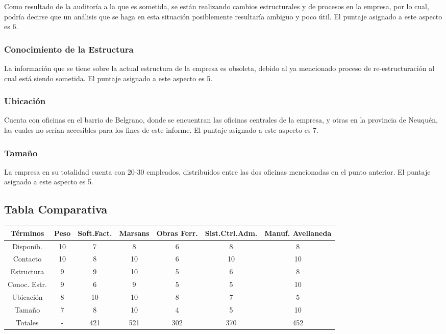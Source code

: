 \documentclass[12pt,a4paper,spanish]{article}
\begin{document}
Como resultado de la auditor\'{i}a a la que es sometida, se est\'{a}n realizando cambios estructurales y de procesos en la empresa, por lo cual, podr\'{i}a decirse que un an\'{a}lisis que se haga en esta situaci\'{o}n posiblemente resultar\'{i}a ambiguo y poco \'{u}til. El puntaje asignado a este aspecto es 6.

\subsubsection{Conocimiento de la Estructura}

La informaci\'{o}n que se tiene sobre la actual estructura de la empresa es obsoleta, debido al ya mencionado proceso de re-estructuraci\'{o}n al cual est\'{a} siendo sometida. El puntaje asignado a este aspecto es 5.

\subsubsection{Ubicaci\'{o}n}

Cuenta con oficinas en el barrio de Belgrano, donde se encuentran las oficinas centrales de la empresa, y otras en la provincia de Neuqu\'{e}n, las cuales no ser\'{i}an accesibles para los fines de este informe. El puntaje asignado a este aspecto es 7.

\subsubsection{Tama\~{n}o}

La empresa en su totalidad cuenta con 20-30 empleados, distribu\'{i}dos entre las dos oficinas mencionadas en el punto anterior. El puntaje asignado a este aspecto es 5.

\subsection{Tabla Comparativa}

\small
\begin{center}
\begin{tabular}{|| c | c | c | c | c | c | c ||}
\hline
\hline
T\'{e}rminos & Peso & Soft.Fact. & Marsans & Obras Ferr. & Sist.Ctrl.Adm. & Manuf. Avellaneda\\
\hline
Disponib.  & 10 & 7 & 8 & 6 & 8 & 8 \\
\hline
Contacto   & 10 & 8 & 10 & 6 & 10 & 10 \\
\hline
Estructura & 9 & 9 & 10 & 5 & 6 & 8 \\
\hline
Conoc. Estr. & 9 & 6 & 9 & 5 & 5 & 10 \\
\hline
Ubicaci\'{o}n & 8 & 10 & 10 & 8 & 7 & 5 \\
\hline
Tama\~{n}o   & 7 & 8 & 10 & 4 & 5 & 10 \\
\hline
\hline
Totales & - & 421 & 521 & 302 & 370 & 452 \\
\hline

\end{tabular}
\end{center}
\end{document}
